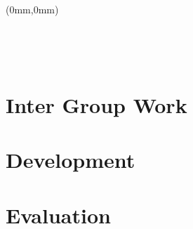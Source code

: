 



%

	
	
	
	
	\begin{titlepage}
	\begin{textblock*}{297mm}(0mm,0mm)
		 \hspace{-6.5mm}

		

	\end{textblock*}
	\thispagestyle{empty}

\ \pagebreak{} 
	\end{titlepage}
\ \thispagestyle{empty} \ \pagebreak{}



\cleardoublepage
	
\newpage
\tableofcontents

\thispagestyle{empty}
\begin{titlepage}
\end{titlepage}
	
	
	\part{Inter Group Work}
	
	
 
\part{Development}
\label{part:development}

	
	
	
	
	
	
	
	
	
	
	
	
	
	
\part{Evaluation}
\label{part:evaluation}
	

